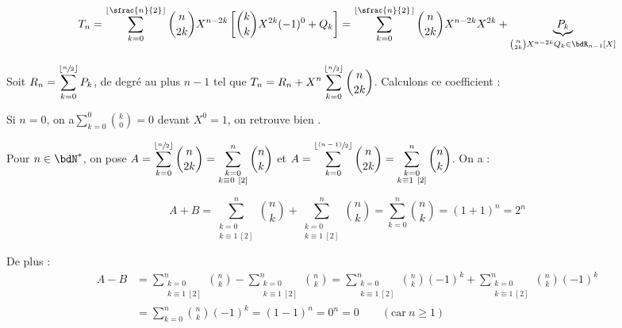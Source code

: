 \documentclass[a4paper,french,bookmarks]{article}
\begin{document}
\begin{enumerate}
{        \[ T_n = \sum_{k=0}^{\left\lfloor \sfrac{n}{2}\right\rfloor} \binom{n}{2k}X^{n-2k}\left[\binom{k}{k}X^{2k}(-1)^0 + Q_k\right] = \sum_{k=0}^{\left\lfloor \sfrac{n}{2}\right\rfloor} \binom{n}{2k}X^{n-2k}X^{2k} + \underbrace{P_k}_{\binom{n}{2k}X^{n-2k}Q_k \in \bdR_{n-1}[X]}\]
        
        Soit $R_n = \displaystyle \sum_{k=0}^{\left\lfloor \sfrac{n}{2}\right\rfloor} P_k$, de degré au plus $n-1$ tel que $T_n = \displaystyle R_n + X^n\sum_{k=0}^{\left\lfloor \sfrac{n}{2}\right\rfloor} \binom{n}{2k}$. Calculons ce coefficient :
        
        \begin{enumerate}
            \ithand Si $n = 0$, on a$\displaystyle \sum_{k=0}^0 \binom{k}{0} = 0$ devant $X^0 = 1$, on retrouve bien .
            
            \ithand Pour $n \in \bdN^*$, on pose $A = \displaystyle \sum_{k=0}^{\left\lfloor \sfrac{n}{2}\right\rfloor} \binom{n}{2k} = \sum_{\substack{k = 0\\k \equiv 0 \ [2]}}^{n} \binom{n}{k}$ et $A = \displaystyle \sum_{k=0}^{\left\lfloor \sfrac{(n-1)}{2}\right\rfloor} \binom{n}{2k} = \sum_{\substack{k = 0\\k \equiv 1 \ [2]}}^{n} \binom{n}{k}$. On a :
            
            \[ A + B = \displaystyle \sum_{\substack{k = 0\\k \equiv 1 \ [2]}}^{n} \binom{n}{k} + \sum_{\substack{k = 0\\k \equiv 1 \ [2]}}^{n} \binom{n}{k} = \sum_{k=0}^n \binom{n}{k} = (1+1)^n = 2^n \]
            
            De plus :
            \begin{align*}
                A - B &=  \displaystyle \sum_{\substack{k = 0\\k \equiv 1 \ [2]}}^{n} \binom{n}{k} -\sum_{\substack{k = 0\\k \equiv 1 \ [2]}}^{n} \binom{n}{k} = \sum_{\substack{k = 0\\k \equiv 1 \ [2]}}^{n} \binom{n}{k}(-1)^{k} +\sum_{\substack{k = 0\\k \equiv 1 \ [2]}}^{n}\binom{n}{k}(-1)^k \\
                &= \displaystyle \sum_{k=0}^n \binom{n}{k}(-1)^k = (1 - 1)^n = 0^n = 0 \qquad(\text{car} \ n \geq 1)
            \end{align*}
        

\end{enumerate}}
\end{enumerate}
\end{document}
